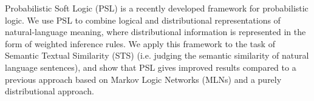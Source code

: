 Probabilistic Soft Logic (PSL) is a recently developed framework for probabilistic logic. We use PSL to combine logical and distributional representations of natural-language meaning, where distributional information is represented in the form of weighted inference rules. We apply this framework to the task of Semantic Textual Similarity (STS) (i.e. judging the semantic similarity of natural language sentences), and show that PSL gives improved results compared to a previous approach based on Markov Logic Networks (MLNs) and a purely distributional approach.
